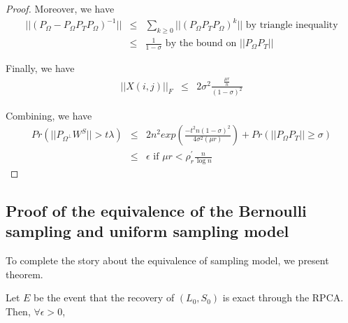 \begin{proof}
Moreover, we have
\begin{eqnarray*}
||(P_{\Omega}-P_{\Omega}P_{T}P_{\Omega})^{-1}|| & \le & \sum_{k\ge0}||(P_{\Omega}P_{T}P_{\Omega})^{k}|| \text{ by triangle inequality}\\
 & \le & \frac{1}{1-\sigma} \text{  by the bound on } ||P_{\Omega}P_{T}||
\end{eqnarray*}


Finally, we have
\begin{eqnarray*}
||X(i,j)||_{F} & \le & 2\sigma^{2}\frac{\frac{\mu r}{n}}{(1-\sigma)^{2}}
\end{eqnarray*}


Combining, we have
\begin{eqnarray*}
Pr(||P_{\Omega^{\bot}}W^{S}||>t\lambda) & \le & 2n^{2}exp(\frac{-t^{2}n(1-\sigma)^{2}}{4\sigma^{2}(\mu r)})+Pr(||P_{\Omega}P_{T}||\ge\sigma)\\
 & \le & \epsilon\text{ if }\mu r<\rho_{r}^{'}\frac{n}{\log n}
\end{eqnarray*}

\end{proof}



\subsection{Proof of the equivalence of the Bernoulli sampling and uniform sampling model } \label{sub:bernoullisampling}
To complete the story about the equivalence of sampling model, we present theorem.
\begin{theorem}
Let $E$ be the event that the recovery of $(L_{0},S_{0})$ is exact
through the RPCA. Then, $\forall\epsilon>0$,
\end{theorem}

